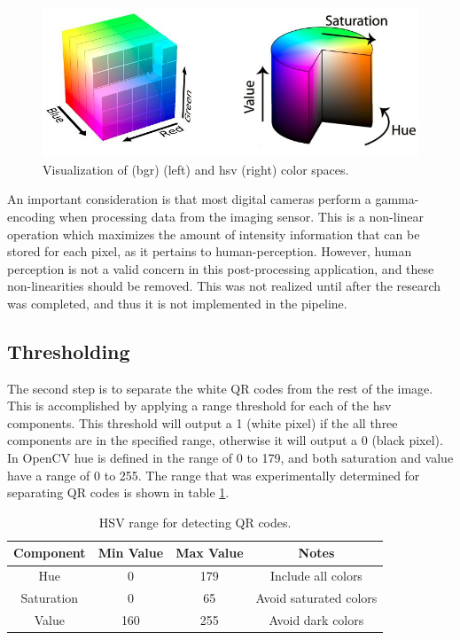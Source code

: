 \begin{figure}
	\centering
    \includegraphics[width=5.5in]{figures/bgr_and_hsv.jpg}
    \caption[Color spaces]{Visualization of \ac{(bgr)} (left) and \ac{hsv} (right) color spaces.}
    \label{figure:color_spaces}
\end{figure} 

An important consideration is that most digital cameras perform a gamma-encoding when processing data from the imaging sensor.  This is a non-linear operation which maximizes the amount of intensity information that can be stored for each pixel, as it pertains to human-perception.  However, human perception is not a valid concern in this post-processing application, and these non-linearities should be removed.  This was not realized until after the research was completed, and thus it is not implemented in the pipeline.

\subsection{Thresholding}
\label{section:qr_thresholding}

The second step is to separate the white QR codes from the rest of the image.  This is accomplished by applying a range threshold for each of the \ac{hsv} components.  This threshold will output a 1 (white pixel) if the all three components are in the specified range, otherwise it will output a 0 (black pixel).  In OpenCV hue is defined in the range of 0 to 179, and both saturation and value have a range of 0 to 255.  The range that was experimentally determined for separating QR codes is shown in table \ref{table:qr_hsv_ranges}.

\begin{table}
    \begin{center}
    \caption[QR Code Detection Values]{HSV range for detecting QR codes.}
    \begin{tabular}[c]{|c|c|c|c|}
        \hline
        Component & Min Value & Max Value & Notes \\
        \hline
        Hue        & 0   & 179 & Include all colors      \\
        Saturation & 0   & 65  & Avoid saturated colors  \\
        Value      & 160 & 255 & Avoid dark colors       \\
        \hline
    \end{tabular}
    \label{table:qr_hsv_ranges}
   \end{center}
\end{table}

